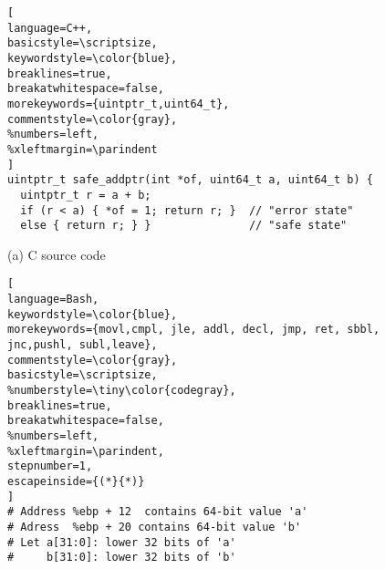 \begin{figure}
\begin{lstlisting}[
language=C++,
basicstyle=\scriptsize,
keywordstyle=\color{blue},
breaklines=true,
breakatwhitespace=false,
morekeywords={uintptr_t,uint64_t},
commentstyle=\color{gray},
%numbers=left,
%xleftmargin=\parindent
]
uintptr_t safe_addptr(int *of, uint64_t a, uint64_t b) {
  uintptr_t r = a + b;
  if (r < a) { *of = 1; return r; }  // "error state" 
  else { return r; } }               // "safe state" 
\end{lstlisting}
\begin{center}
{\small (a) C source code}
\end{center}
\begin{lstlisting}[
language=Bash,
keywordstyle=\color{blue},
morekeywords={movl,cmpl, jle, addl, decl, jmp, ret, sbbl, jnc,pushl, subl,leave},
commentstyle=\color{gray},
basicstyle=\scriptsize,
%numberstyle=\tiny\color{codegray},
breaklines=true,
breakatwhitespace=false,
%numbers=left,
%xleftmargin=\parindent,
stepnumber=1,
escapeinside={(*}{*)}
]
# Address %ebp + 12  contains 64-bit value 'a'  
# Adress  %ebp + 20 contains 64-bit value 'b'
# Let a[31:0]: lower 32 bits of 'a' 
#     b[31:0]: lower 32 bits of 'b'


\end{lstlisting}
\end{figure}

